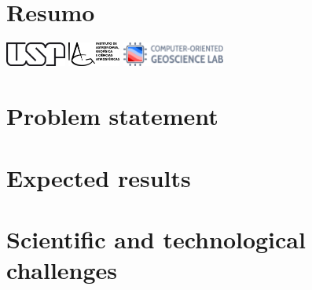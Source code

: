 \documentclass[onecolumn,a4paper,12pt]{article}
\begin{document}
\section*{\normalsize Resumo}
\beginnumbering
\autopar


\lipsum[1-3]  %


\endnumbering
\vfill
\begin{center}
  \includegraphics[height=0.8cm]{figures/usp.png}\hspace{1cm}
  \includegraphics[height=0.8cm]{figures/iag.png}\hspace{1cm}
  \includegraphics[height=0.8cm]{figures/compgeolab.png}
\end{center}

\newpage
\setcounter{page}{1}

\section{Problem statement}



\lipsum[1-5]



\section{Expected results}

\lipsum[1-5]





\section{Scientific and technological challenges}
\end{document}
